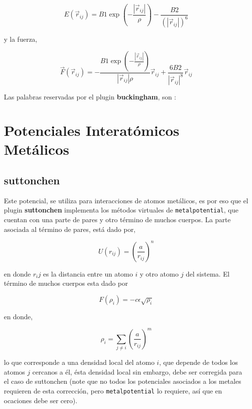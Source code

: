 $$E(\vec{r}_{ij}) = B1 \exp\left(-\frac{|\vec{r}_{ij}|}{\rho}\right) - \frac{B2}{(|\vec{r}_{ij}|)^6}$$

y la fuerza,

$$\vec{F}(\vec{r}_{ij}) = -\frac{B1\exp\left(-\frac{|\vec{r}_{ij}|}{\rho}\right)}{|\vec{r}_{ij}|\rho}\vec{r}_{ij} + \frac{6B2}{|\vec{r}_{ij}|^8}\vec{r}_{ij}$$

Las palabras reservadas por el plugin \textbf{buckingham}, son :


\section{Potenciales Interat\'omicos Met\'alicos}
\subsection{suttonchen}
Este potencial, se utiliza para interacciones de atomos met\'alicos, es por eso que el plugin \textbf{suttonchen} implementa los m\'etodos virtuales de \verb|metalpotential|, que cuentan con una parte de pares y otro t\'ermino de muchos cuerpos. La parte asociada al t\'ermino de pares, est\'a dado por,

$$U(r_{ij}) = \left(\frac{a}{r_{ij}}\right)^n$$

en donde $r_ij$ es la distancia entre un atomo $i$ y otro atomo $j$ del sistema. El t\'ermino de muchos cuerpos esta dado por

$$F(\rho_{i}) = -c\epsilon\sqrt{\rho_i}$$

en donde,

$$\rho_i = \sum_{j\neq i} \left(\frac{a}{r_{ij}}\right)^m$$

lo que corresponde a una densidad local del atomo $i$, que depende de todos los atomos $j$ cercanos a \'el, \'esta densidad local sin embargo, debe ser corregida para el caso de suttonchen (note que no todos los potenciales asociados a los metales requieren de esta correcci\'on, pero \verb|metalpotential| lo requiere, as\'i que en ocaciones debe ser cero).

